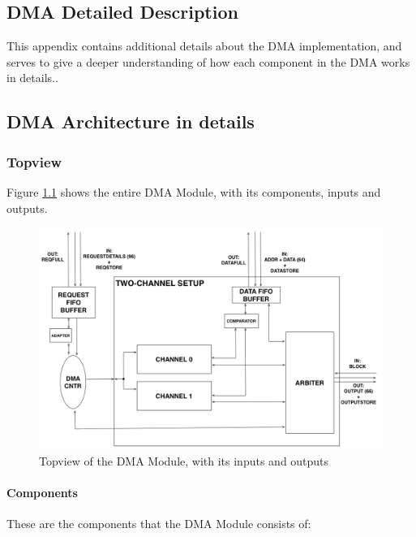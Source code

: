 \begin{appendix}

\chapter{DMA Detailed Description}

This appendix contains additional details about the DMA implementation, and serves to give a deeper understanding of how each component in the DMA works in details..
\section{DMA Architecture in details}
\subsection{Topview}
Figure \ref{fig:TopViewFinalSimple2IO} shows the entire DMA Module, with its components,  inputs and outputs.


\begin{figure}[h!]
    \centering
    \includegraphics[width=1.0\textwidth]{Figures/DMA/TopViewFinalSimple2IO}
    \caption{Topview of the DMA Module, with its inputs and outputs}
    \label{fig:TopViewFinalSimple2IO}
\end{figure}

\subsubsection{Components}
These are the components that the DMA Module consists of:


\end{appendix}
